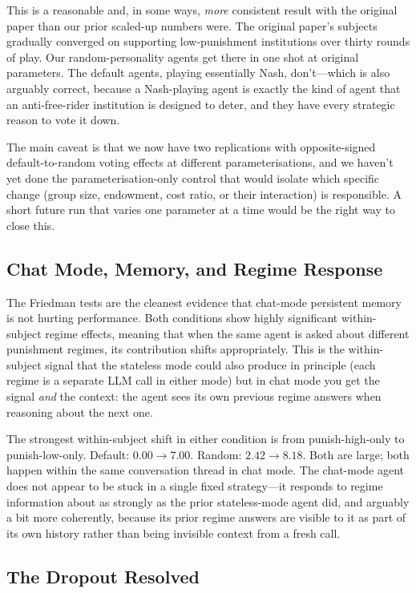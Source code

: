 \documentclass[12pt, a4paper]{article}
\begin{document}
This is a reasonable and, in some ways, \emph{more} consistent result with the original paper than our prior scaled-up numbers were. The original paper's subjects gradually converged on supporting low-punishment institutions over thirty rounds of play. Our random-personality agents get there in one shot at original parameters. The default agents, playing essentially Nash, don't---which is also arguably correct, because a Nash-playing agent is exactly the kind of agent that an anti-free-rider institution is designed to deter, and they have every strategic reason to vote it down.

The main caveat is that we now have two replications with opposite-signed default-to-random voting effects at different parameterisations, and we haven't yet done the parameterisation-only control that would isolate which specific change (group size, endowment, cost ratio, or their interaction) is responsible. A short future run that varies one parameter at a time would be the right way to close this.

\subsection{Chat Mode, Memory, and Regime Response}

The Friedman tests are the cleanest evidence that chat-mode persistent memory is not hurting performance. Both conditions show highly significant within-subject regime effects, meaning that when the same agent is asked about different punishment regimes, its contribution shifts appropriately. This is the within-subject signal that the stateless mode could also produce in principle (each regime is a separate LLM call in either mode) but in chat mode you get the signal \emph{and} the context: the agent sees its own previous regime answers when reasoning about the next one.

The strongest within-subject shift in either condition is from punish-high-only to punish-low-only. Default: $0.00 \to 7.00$. Random: $2.42 \to 8.18$. Both are large; both happen within the same conversation thread in chat mode. The chat-mode agent does not appear to be stuck in a single fixed strategy---it responds to regime information about as strongly as the prior stateless-mode agent did, and arguably a bit more coherently, because its prior regime answers are visible to it as part of its own history rather than being invisible context from a fresh call.

\subsection{The Dropout Resolved}
\end{document}
